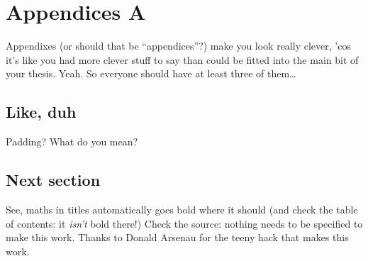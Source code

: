 \chapter{Appendices A}
\label{app:a}

Appendixes (or should that be ``appendices''?) make you look really clever, 'cos
it's like you had more clever stuff to say than could be fitted into the main
bit of your thesis. Yeah. So everyone should have at least three of them\dots

\section{Like, duh}
\label{sec:Duh}
Padding? What do you mean?

\section{Next section}
\label{sec:EqnTitle}
See, maths in titles automatically goes bold where it should (and check the
table of contents: it \emph{isn't} bold there!) Check the source: nothing
needs to be specified to make this work. Thanks to Donald Arsenau for the
teeny hack that makes this work.